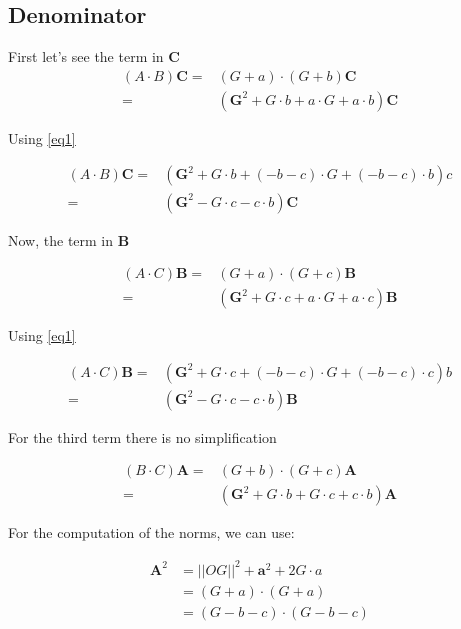 \documentclass[10pt,a4paper]{article}
\begin{document}
\subsection{Denominator}


First let's see the term in $\mathbf{C}$
\begin{align*}
 \left({A}\cdot {B}\right)\mathbf{C}
	=& \left( G + a \right) \cdot \left( G + b \right) \mathbf{C} \\
	 =& (\mathbf{G}^2 +  G \cdot b	+ a \cdot G + a \cdot b    ) \mathbf{C}
\end{align*}

Using \eqref{eq1}

\begin{align}
 \left({A}\cdot {B}\right)\mathbf{C}
	 =& (\mathbf{G}^2 +  G \cdot b	+ (-b - c) \cdot G + (-b - c) \cdot b    ) c \nonumber \\
	 =& (\mathbf{G}^2 - G \cdot c - c \cdot b)\mathbf{C}
\end{align}



Now, the term in $\mathbf{B}$


\begin{align*}
 \left({A}\cdot {C}\right)\mathbf{B} 
	=& \left( G + a \right) \cdot \left( G + c \right) \mathbf{B} \\
	 =& (\mathbf{G}^2 +  G \cdot c	+ a \cdot G + a \cdot c    ) \mathbf{B}
\end{align*}

Using \eqref{eq1}

\begin{align}
 \left({A}\cdot {C}\right)\mathbf{B}
	 =& (\mathbf{G}^2 +  G \cdot c	+ (-b - c) \cdot G + (-b - c) \cdot c    ) b \nonumber \\
	 =& (\mathbf{G}^2 - G \cdot c - c \cdot b)\mathbf{B}
\end{align}


For the third term there is no simplification

\begin{align}
 \left({B}\cdot {C}\right)\mathbf{A}
	=& \left( G + b \right) \cdot \left( G + c \right) \mathbf{A}\\
	=& (\mathbf{G}^2 + G \cdot b + G \cdot c + c \cdot b)\mathbf{A}
\end{align}


For the computation of the norms, we can use:

\begin{align*}
\mathbf{A}^2 &= ||OG||^2 + \mathbf{a}^2 + 2 G \cdot a \\
        &=   (G+a) \cdot (G+a) \\
        &=   (G-b-c) \cdot (G-b-c) \\
\end{align*}
\end{document}
